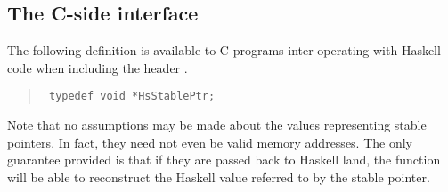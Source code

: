 \subsection{The C-side interface
}
The following definition is available to C programs inter-operating with
 Haskell code when including the header .
\par
\begin{quote}
{\haddockverb\begin{verbatim}
 typedef void *HsStablePtr;  
\end{verbatim}}
\end{quote}
Note that no assumptions may be made about the values representing stable
 pointers.  In fact, they need not even be valid memory addresses.  The only
 guarantee provided is that if they are passed back to Haskell land, the
 function  will be able to reconstruct the
 Haskell value referred to by the stable pointer.
\par

